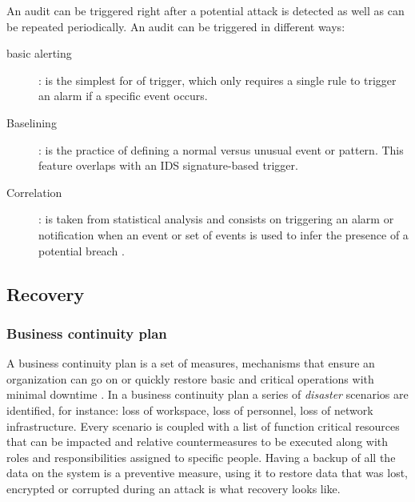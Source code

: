An audit can be triggered right after a potential attack is detected as well as
can be repeated periodically. An audit can be triggered in different ways:
\begin{description}
  \item [basic alerting]: is the simplest for of trigger, which only requires
  a single rule to trigger an alarm if a specific event occurs.
  \item [Baselining]: is the practice of defining a normal versus unusual
  event or pattern. This feature overlaps with an IDS signature-based trigger.
  \item [Correlation]: is taken from statistical analysis and consists on
  triggering an alarm or notification when an event or set of events is used to
  infer the presence of a potential breach \cite{WS15}.
\end{description}

\subsection{Recovery}

\subsubsection{Business continuity plan}
A business continuity plan is a set of measures, mechanisms that ensure an
organization can go on or quickly restore basic and critical operations
with minimal downtime \cite{TW10}. In a business continuity plan a series of
\emph{disaster} scenarios are identified, for instance: loss of workspace, loss
of personnel, loss of network infrastructure. Every scenario is coupled with a list of
function critical resources that can be impacted and relative countermeasures
to be executed along with roles and responsibilities assigned to
specific people. Having a backup of all the data on the system
is a preventive measure, using it to restore data that was lost, encrypted or
corrupted during an attack is what recovery looks like.


